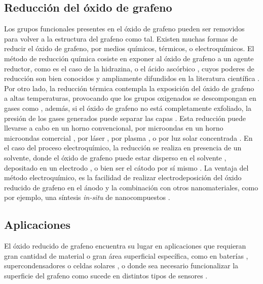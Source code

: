 \subsection{Reducción del óxido de grafeno}
Los grupos funcionales presentes en el óxido de grafeno pueden ser removidos para volver a la estructura del grafeno como tal.
Existen muchas formas de reducir el óxido de grafeno, por medios químicos, térmicos, o electroquímicos. El método de reducción química cosiste en exponer al óxido de grafeno a un agente reductor, como es el caso de la hidrazina, o el ácido ascórbico \citep{Fernandez-Merino2010}, cuyos poderes de reducción son bien conocidos y ampliamente difundidos en la literatura científica \citep{Chua2015}. Por otro lado, la reducción térmica contempla la exposición del óxido de grafeno a altas temperaturas, provocando que los grupos oxigenados se descompongan en gases como , además, si el óxido de grafeno no está completamente exfoliado, la presión de los gases generados puede separar las capas \citep{Pei2012}. Esta reducción puede llevarse a cabo en un horno convencional, por microondas en un horno microondas comercial \citep{Zhu2010a}, por láser \citep{El-Kady2013}, por plasma \citep{Lee2012}, o por luz solar concentrada \citep{Mohandoss2017}. En el caso del proceso electroquímico, la reducción se realiza en presencia de un solvente, donde el óxido de grafeno puede estar disperso en el solvente \citep{Liu2011}, depositado en un electrodo \citep{Harima2011, Toh2014}, o bien ser el cátodo por sí mismo \citep{Feng2016}. La ventaja del método electroquímico, es la facilidad de realizar electrodeposición del óxido reducido de grafeno en el ánodo y la combinación con otros nanomateriales, como por ejemplo, una síntesis \emph{in-situ} de nanocompuestos \citep{Liu2011, Xie2014}.


\subsection{Aplicaciones}
El óxido reducido de grafeno encuentra su lugar en aplicaciones que requieran gran cantidad de material o gran área superficial específica, como en baterías \citep{Li2014}, supercondensadores \citep{Stoller2008} o celdas solares \citep{Roy-mayhew2014}, o donde sea necesario funcionalizar la superficie del grafeno como sucede en distintos tipos de sensores \citep{Schedin2007, Haick2013}.

